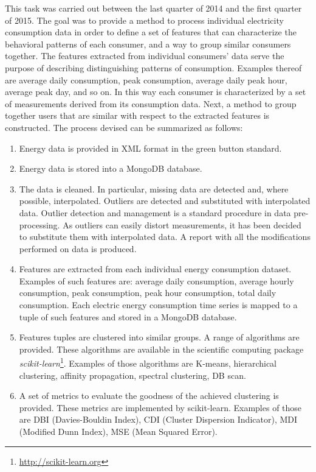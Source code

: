 This task was carried out between the last quarter of 2014 and the first quarter of 2015.
The goal was to provide a method to process individual electricity consumption
data in order to define a set of features that can characterize the behavioral patterns of each
consumer, and a way to group similar consumers together. The features extracted from individual consumers' data serve the purpose of describing distinguishing patterns of consumption. Examples thereof are average daily consumption, peak consumption, average daily peak hour, average peak day, and so on. In this way each consumer is characterized by a set of measurements derived from its consumption data. Next, a method to group together users that are similar with respect to the extracted features is constructed.  The process devised can be summarized
as follows:

\begin{enumerate} 
\item Energy data is provided in XML format in the green button standard.

\item Energy data is stored into a MongoDB database.

\item The data is cleaned. In particular, missing data are detected and, where possible, interpolated. Outliers are detected and substituted with interpolated data.  Outlier detection and management is a standard procedure in data pre-processing. As outliers can easily distort measurements, it has been decided to substitute them with interpolated data. A report with all the modifications performed on
data is produced. 

\item Features are extracted from each individual energy consumption dataset. Examples of such
features are: average daily consumption, average hourly consumption, peak consumption, peak hour
consumption, total daily consumption. Each electric energy consumption time series is mapped to a
tuple of such features and stored in a MongoDB database.

\item Features tuples are clustered into similar groups. A range of algorithms are provided. These
algorithms are available in the scientific computing package \textit{scikit-learn}\footnote{\url{http://scikit-learn.org}}. Examples of those algorithms are K-means,
hierarchical clustering, affinity propagation, spectral clustering, DB scan.

\item A set of metrics to evaluate the goodness of the achieved clustering is provided. These metrics are implemented by scikit-learn. Examples of those are 
DBI (Davies-Bouldin Index),
CDI  (Cluster Dispersion Indicator),
MDI (Modified Dunn Index),
MSE (Mean Squared Error).
\end{enumerate}

